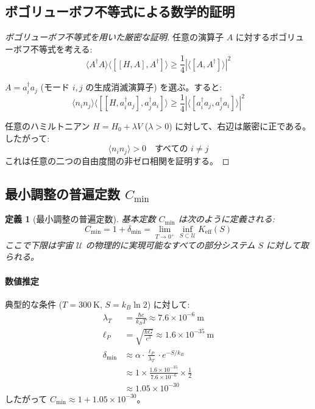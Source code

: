 \documentclass[11pt,a4paper]{article}
\newtheorem{definition}{定義}
\begin{document}
	\subsection{ボゴリューボフ不等式による数学的証明}
	
	\begin{proof}[ボゴリューボフ不等式を用いた厳密な証明]
		任意の演算子 $A$ に対するボゴリューボフ不等式を考える:
		\begin{equation}
			\langle A^\dagger A \rangle \langle [[H, A], A^\dagger] \rangle \geq \frac{1}{4} |\langle [A, A^\dagger] \rangle|^2
		\end{equation}
		
		$A = a_i^\dagger a_j$ (モード $i,j$ の生成消滅演算子) を選ぶ。すると:
		\begin{equation}
			\langle n_i n_j \rangle \langle [[H, a_i^\dagger a_j], a_j^\dagger a_i] \rangle \geq \frac{1}{4} |\langle [a_i^\dagger a_j, a_j^\dagger a_i] \rangle|^2
		\end{equation}
		
		任意のハミルトニアン $H = H_0 + \lambda V$ ($\lambda > 0$) に対して、右辺は厳密に正である。したがって:
		\begin{equation}
			\langle n_i n_j \rangle > 0 \quad \text{すべての } i \neq j
		\end{equation}
		これは任意の二つの自由度間の非ゼロ相関を証明する。
	\end{proof}
	
	\subsection{最小調整の普遍定数 $C_{\min}$}
	
	\begin{definition}[最小調整の普遍定数]
		基本定数 $C_{\min}$ は次のように定義される:
		\begin{equation}
			C_{\min} = 1 + \delta_{\min} = \lim_{T \to 0^+} \inf_{S \subset \mathcal{U}} K_{\mathrm{eff}}(S)
		\end{equation}
		ここで下限は宇宙 $\mathcal{U}$ の物理的に実現可能なすべての部分システム $S$ に対して取られる。
	\end{definition}
	
	\paragraph{数値推定}
	典型的な条件 ($T = 300\ \mathrm{K}$, $S = k_B \ln 2$) に対して:
	\begin{align}
		\lambda_T &= \frac{\hbar c}{k_B T} \approx 7.6 \times 10^{-6}\ \mathrm{m} \\
		\ell_P &= \sqrt{\frac{\hbar G}{c^3}} \approx 1.6 \times 10^{-35}\ \mathrm{m} \\
		\delta_{\min} &\approx \alpha \cdot \frac{\ell_P}{\lambda_T} \cdot e^{-S/k_B} \\
		&\approx 1 \times \frac{1.6 \times 10^{-35}}{7.6 \times 10^{-6}} \times \frac{1}{2} \\
		&\approx 1.05 \times 10^{-30}
	\end{align}
	したがって $C_{\min} \approx 1 + 1.05 \times 10^{-30}$。
	
\end{document}
